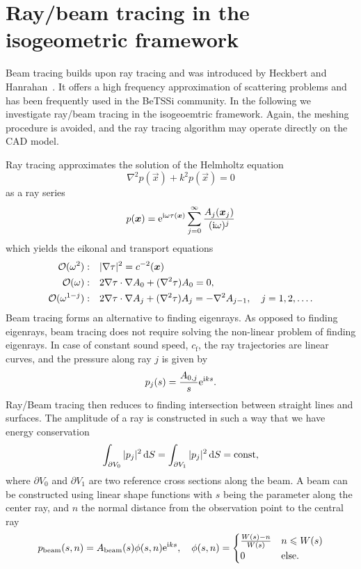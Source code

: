 \section{Ray/beam tracing in the isogeometric framework}
Beam tracing builds upon ray tracing and was introduced by Heckbert and Hanrahan~\cite{Heckbert1984btp}. It offers a high frequency approximation of scattering problems and has been frequently used in the BeTSSi community. In the following we investigate ray/beam tracing in the isogeoemtric framework. Again, the meshing procedure is avoided, and the ray tracing algorithm may operate directly on the CAD model.

Ray tracing approximates the solution of the Helmholtz equation~\cite{Jensen2011coa}
\begin{equation*}
	\nabla^2 p(\vec{x}) + k^2p(\vec{x}) = 0
\end{equation*}
as a ray series
\begin{equation*}
	p(\vec{x}) = \euler^{\imag\omega\tau(\vec{x})}\sum_{j=0}^\infty \frac{A_j(\vec{x}_j)}{(\imag\omega)^j}
\end{equation*}
which yields the eikonal and transport equations
\begin{align*}
\bigoh(\omega^2): &\quad |\nabla \tau|^2 = c^{-2}(\vec{x})\\
\bigoh(\omega): &\quad 2\nabla\tau\cdot\nabla A_0 +(\nabla^2\tau) A_0 = 0,\\
\bigoh(\omega^{1-j}): &\quad 2\nabla\tau\cdot\nabla A_j +(\nabla^2\tau) A_j = -\nabla^2 A_{j-1},\quad j = 1,2,\dots.
\end{align*}
Beam tracing forms an alternative to finding eigenrays. As opposed to finding eigenrays, beam tracing does not require solving the non-linear problem of finding eigenrays. 
In case of constant sound speed, $c_{\mathrm{f}}$, the ray trajectories are linear curves, and the pressure along ray $j$ is given by
\begin{equation*}
	p_j(s) = \frac{A_{0,j}}{s}\mathrm{e}^{\mathrm{i} k s}.
\end{equation*}
Ray/Beam tracing then reduces to finding intersection between straight lines and surfaces. The amplitude of a ray is constructed in such a way that we have energy conservation
\begin{equation*}
	\int_{\partial V_0} |p_j|^2\, \mathrm{d} S = \int_{\partial V_1} |p_j|^2\, \mathrm{d} S = \text{const},
\end{equation*}
where $\partial V_0$ and $\partial V_1$ are two reference cross sections along the beam. A beam can be constructed using linear shape functions with $s$ being the parameter along the center ray, and $n$ the normal distance from the observation point to the central ray
\begin{equation*}
	p_{\text{beam}}(s,n) = A_{\text{beam}}(s)\phi(s,n)\mathrm{e}^{\mathrm{i} k s},\quad \phi(s,n) = \begin{cases} \frac{W(s)-n}{W(s)} & n\leqslant W(s)\\
	0 & \text{else.}\end{cases}
\end{equation*}

